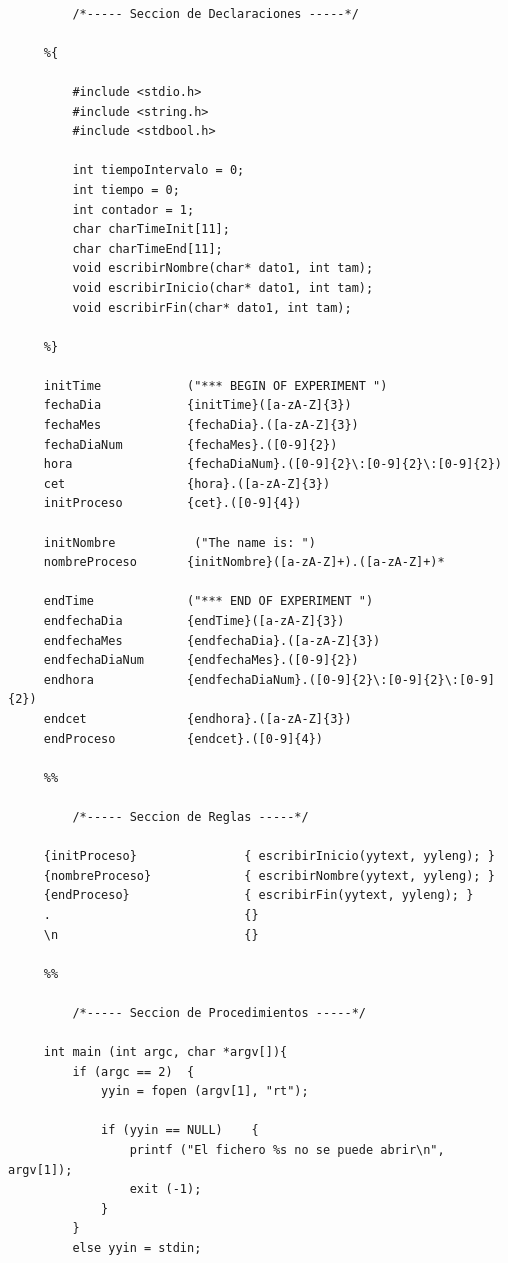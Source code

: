  \lstset{language=C, breaklines=true, basicstyle=\footnotesize}
	 \begin{lstlisting}[frame=single]
	 
	     /*----- Seccion de Declaraciones -----*/
     
     %{
     
	     #include <stdio.h>
	     #include <string.h>
	     #include <stdbool.h>
	     
	     int tiempoIntervalo = 0;
	     int tiempo = 0;
	     int contador = 1;
	     char charTimeInit[11];
	     char charTimeEnd[11];
	     void escribirNombre(char* dato1, int tam);
	     void escribirInicio(char* dato1, int tam);
	     void escribirFin(char* dato1, int tam);
     
     %}
     
     initTime            ("*** BEGIN OF EXPERIMENT ")
     fechaDia            {initTime}([a-zA-Z]{3})
     fechaMes            {fechaDia}.([a-zA-Z]{3})
     fechaDiaNum         {fechaMes}.([0-9]{2})
     hora                {fechaDiaNum}.([0-9]{2}\:[0-9]{2}\:[0-9]{2})
     cet                 {hora}.([a-zA-Z]{3})
     initProceso         {cet}.([0-9]{4})
     
     initNombre           ("The name is: ")
     nombreProceso       {initNombre}([a-zA-Z]+).([a-zA-Z]+)* 
     
     endTime             ("*** END OF EXPERIMENT ")
     endfechaDia         {endTime}([a-zA-Z]{3})
     endfechaMes         {endfechaDia}.([a-zA-Z]{3})
     endfechaDiaNum      {endfechaMes}.([0-9]{2})
     endhora             {endfechaDiaNum}.([0-9]{2}\:[0-9]{2}\:[0-9]{2})
     endcet              {endhora}.([a-zA-Z]{3})
     endProceso          {endcet}.([0-9]{4})
     
     %%
     
	     /*----- Seccion de Reglas -----*/
     
     {initProceso}               { escribirInicio(yytext, yyleng); } 
     {nombreProceso}             { escribirNombre(yytext, yyleng); } 
     {endProceso}                { escribirFin(yytext, yyleng); } 
     .                           {}
     \n                          {}
     
     %%
     
	     /*----- Seccion de Procedimientos -----*/
     
     int main (int argc, char *argv[]){
	     if (argc == 2)  {
		     yyin = fopen (argv[1], "rt");
		     
		     if (yyin == NULL)    {
			     printf ("El fichero %s no se puede abrir\n", argv[1]);
			     exit (-1);
		     }
	     }
	     else yyin = stdin;
	     

\end{lstlisting}
